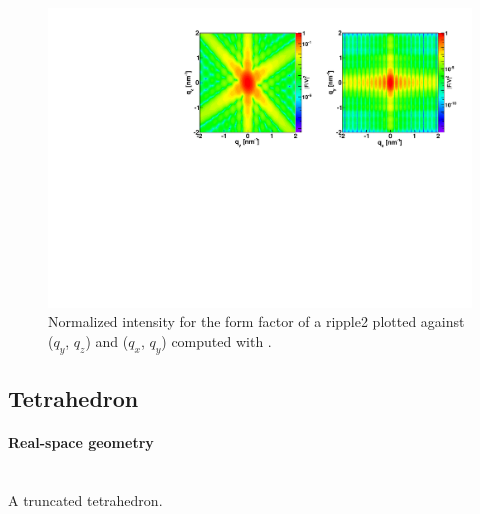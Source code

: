 \begin{figure}[h]
\begin{center}
\includegraphics[angle=-90,width=\textwidth]{fig/ff/figffripple2.pdf}
\end{center}
\caption{Normalized intensity for the form factor of a ripple2 plotted against ($q_y$, $q_z$) and  ($q_x$, $q_y$)
  computed with .}
\label{fig:FFripple2Ex}
\end{figure}

\clearpage
\subsection{Tetrahedron} \label{sec:Tetrahedron}
 
\paragraph{Real-space geometry}\strut\\
A truncated tetrahedron.

